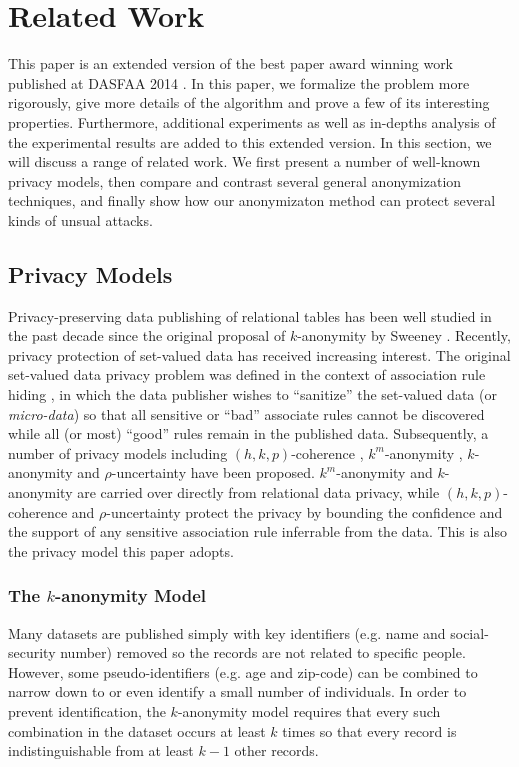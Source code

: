 \section{Related Work}
\label{sec:related}
This paper is an extended version of the best
paper award winning work published at DASFAA 2014 \cite{JiaPXZL14}.
In this paper, we formalize the problem more rigorously,
give more details of the algorithm and prove a few of its
interesting properties. Furthermore, additional
experiments as well as in-depths analysis of the experimental results
are added to this extended version.
In this section, we will discuss
a range of related work. We first present a number
of well-known privacy models, then compare and contrast several general
anonymization techniques, and finally show how our anonymizaton method
can protect several kinds of unsual attacks.

\subsection{Privacy Models}

Privacy-preserving data publishing of relational tables has been well
studied in the past decade since the original proposal of $k$-anonymity by
Sweeney \etal \cite{Sweeney2002:k-anonymity}.
Recently, privacy protection of set-valued data has received increasing
interest. The original set-valued data privacy problem was defined in the
context of association rule hiding
\cite{atallah99:disclosure,tkde:VerykiosEBSD04:ARH,tkde:WuCC07:hiding},
in which the data publisher
wishes to ``sanitize'' the set-valued data (or {\em micro-data}) so that all
sensitive or ``bad'' associate rules cannot be discovered while all (or most)
``good'' rules remain in the published data.
Subsequently, a number of privacy models
including $(h,k,p)$-coherence \cite{Xu:2008:ATD},
$k^m$-anonymity \cite{Terrovitis:2008:PAS},
$k$-anonymity \cite{He:2009:ASD} and
$\rho$-uncertainty \cite{Cao:2010:rho} have been proposed.
$k^m$-anonymity and $k$-anonymity are carried over directly from
relational data privacy,
while $(h,k,p)$-coherence and $\rho$-uncertainty protect the
privacy by bounding the confidence and the support of
any sensitive association rule inferrable from the data. This is
also the privacy model this paper adopts.

\subsubsection{The $k$-anonymity Model}
Many datasets are published simply with key identifiers (e.g. name and
social-security number) removed so the records are not related to specific
people.  However, some pseudo-identifiers (e.g. age and zip-code) can be
combined to narrow down to or even identify a small number of individuals.
In order to prevent identification, the $k$-anonymity model requires that
every such combination in the dataset occurs at least $k$
times so that
every record is indistinguishable from at least $k-1$ other records.

